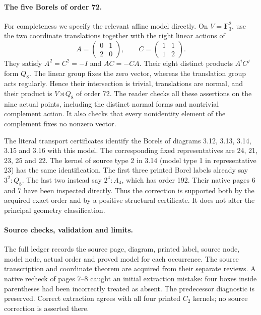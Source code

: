 \documentclass[11pt]{article}
\begin{document}
\newpage
\paragraph{The five Borels of order 72.}
For completeness we specify the relevant affine model directly. On
$V=\mathbf F_3^2$, use the two coordinate translations together with
the right linear actions of
\[
 A=\begin{pmatrix}0&1\\2&0\end{pmatrix},\qquad
 C=\begin{pmatrix}1&1\\1&2\end{pmatrix}.
\]
They satisfy $A^2=C^2=-I$ and $AC=-CA$. Their eight distinct products
$A^iC^j$ form $Q_8$. The linear group fixes the zero vector, whereas
the translation group acts regularly. Hence their intersection is trivial,
translations are normal, and their product is $V\rtimes Q_8$ of order 72.
The reader checks all these assertions on the nine actual points, including
the distinct normal forms and nontrivial complement action. It also checks
that every nonidentity element of the complement fixes no nonzero vector.

The literal transport certificates identify the Borels of diagrams
3.12, 3.13, 3.14, 3.15 and 3.16 with this model. The corresponding fixed
representatives are 24, 21, 23, 25 and 22. The kernel of source type 2 in
3.14 (model type 1 in representative 23) has the same identification.
The first three printed Borel labels already say $3^2:Q_8$.
The last two instead say $2^4:A_4$, which has order 192. Their native
pages 6 and 7 have been inspected directly. Thus the correction is supported
both by the acquired exact order and by a positive structural certificate.
It does not alter the principal geometry classification.

\paragraph{Source checks, validation and limits.}
The full ledger records the source page, diagram, printed label, source
node, model node, actual order and proved model for each occurrence.
The source transcription and coordinate theorem are acquired from their
separate reviews. A native recheck of pages 7--8 caught an initial extraction
mistake: four boxes inside parentheses had been incorrectly treated as
absent. The predecessor diagnostic is preserved. Correct extraction agrees
with all four printed $C_2$ kernels; no source correction is asserted there.
\end{document}
